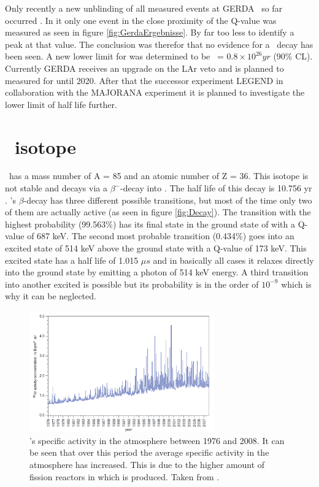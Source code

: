 \documentclass[encoding=utf8,british]{tumphthesis}
\begin{document}
Only recently a new unblinding of all measured events at GERDA \PII\ so far  occurred \cite{zsigmond_new_2018}.
In it only one event in the close proximity of the Q-value was measured as seen in figure \ref{fig:GerdaErgebnisse}.
By far too less to identify a peak at that value.
The conclusion was therefor that no evidence for a \onbb\ decay has been seen.
A new lower limit for  was determined to be \thalfzero\ = $0.8\times10^{26}\unit{yr}$ (90$\%$ CL).
Currently GERDA receives an upgrade on the LAr veto and is planned to measured for until 2020.
After that the successor experiment LEGEND in collaboration with the MAJORANA experiment it is planned to investigate the lower limit of  half life further.




\section{\Kr\ isotope}
\label{sec:Kry85}

\Kr\ has a mass number of A = 85 and an atomic number of Z = 36.
This isotope is not stable and decays via a $\beta^-$-decay into .
The half life of this decay is 10.756 yr \cite{singh_nuclear_2014}.
\Kr's $\beta$-decay has three different possible transitions, but most of the time only two of them are actually active (as seen in figure \ref{fig:Decay}).
The transition with the highest probability (99.563$\%$) has its final state in the ground state of  with a Q-value of 687 keV.
The second most probable transition (0.434$\%$) goes into an excited state of 514 keV above the ground state with a Q-value of 173 keV.
This excited state has a half life of 1.015 $\unit{\mu s}$ and in basically all cases it relaxes directly into the ground state by emitting a photon of 514 keV energy. 
A third transition into another excited  is possible but its probability is in the order of $10^{-9}$ which is why it can be neglected. 
\\

\begin{figure}[t!]
	\centering
	\ifmakefigures%
	\includegraphics[width=80mm]{./Bilder/Kr85Aenderung.png}
	\fi%
	\caption{
	    \Kr's specific activity in the atmosphere between 1976 and 2008. It can be seen that over this period the average specific activity in the atmosphere has increased. This is due to the higher amount of fission reactors in which \Kr is produced.   
		Taken from \cite{bieringer_trace_2009}.
	}
    \label{fig:Kr85Aenderung}
	\end{figure}
\end{document}
